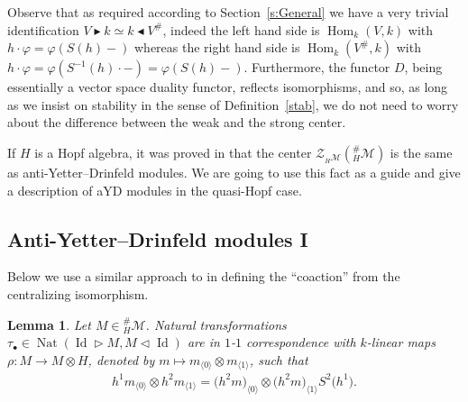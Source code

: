 \documentclass[10pt,a4paper]{amsart}
\newcommand{\Zc}{\mathcal{Z}}
\newcommand{\hmod}{{_H\mathcal{M}}}
\newcommand{\hhash}{{^{\#}_H \mathcal{M}}}
\newcommand{\la}{\triangleright}
\newcommand{\ra}{\triangleleft}
\newcommand{\lab}{\blacktriangleright}
\newcommand{\rab}{\blacktriangleleft}
\numberwithin{equation}{section}
\newtheorem{Lemma}[Theorem]{Lemma}
 { \theoremstyle{definition}
\newtheorem{Definition}[Theorem]{Definition}
\newtheorem{Remark}[Theorem]{Remark} }
\begin{document}
 \begin{Remark}Observe that as required according to Section~\ref{s:General} we have a very trivial identification $V\lab k\simeq k\rab V^{\#}$, indeed the left hand side is $\operatorname{Hom}_k(V,k)$ with $h\cdot\varphi=\varphi(S(h)-)$ whereas the right hand side is $\operatorname{Hom}_k(V^{\#},k)$ with $h\cdot\varphi=\varphi(S^{-1}(h)\cdot-)=\varphi(S(h)-)$. Furthermore, the functor $D$, being essentially a vector space duality functor, reflects isomorphisms, and so, as long as we insist on stability in the sense of Definition~\ref{stab}, we do not need to worry about the difference between the weak and the strong center.
\end{Remark}

If $H$ is a Hopf algebra, it was proved in \cite{hks} that the center $\Zc_\hmod(\hhash) $ is the same as anti-Yetter--Drinfeld modules. We are going to use this fact as a guide and give a description of aYD modules in the quasi-Hopf case.

\subsection{Anti-Yetter--Drinfeld modules I} Below we use a similar approach to \cite{majid} in defining the ``coaction'' from the centralizing isomorphism.

\begin{Lemma}\label{aYD-module lemma}Let $M \in \hhash$. Natural transformations $\tau_{\bullet} \in \operatorname{Nat} (\operatorname{Id} \la M, M \ra \operatorname{Id})$ are in $1$-$1$ correspondence with $k$-linear maps $\rho\colon M \rightarrow M \otimes H $, denoted by $m \mapsto m_{\langle0\rangle} \otimes m_{\langle1\rangle}$, such that
\begin{gather}\label{aYD-module}
h^1 m_{\langle 0\rangle} \otimes h^2 m_{\langle 1\rangle} = \big(h^2 m\big)_{\langle0\rangle} \otimes \big(h^2 m\big)_{\langle 1\rangle} S^2\big(h^1\big).
\end{gather}
\end{Lemma}
\end{document}
